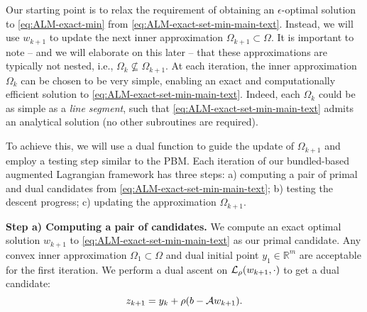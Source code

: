 \documentclass[11pt]{article}
\begin{document}
Our starting point is to relax the requirement of obtaining an $\epsilon$-optimal solution to \cref{eq:ALM-exact-min} from \cref{eq:ALM-exact-set-min-main-text}. Instead, we will use $w_{k+1}$ to update the next inner approximation $\Omega_{k+1} \subset \Omega$. 
It is important to note -- and we will elaborate on this later -- that these approximations are typically not nested, i.e.,  $\Omega_k \not\subseteq \Omega_{k+1}$. At each iteration, the inner approximation $\Omega_{k}$ can be chosen to be very simple, enabling an exact and computationally efficient solution to \cref{eq:ALM-exact-set-min-main-text}. Indeed, each $\Omega_{k}$ 
could be as simple as a \textit{line segment}, such that \cref{eq:ALM-exact-set-min-main-text} admits an analytical solution (no other subroutines are required). 

To achieve this, we will use a dual function to guide the update of $\Omega_{k+1}$ and employ a testing step similar to the PBM. Each iteration of our bundled-based augmented Lagrangian framework has three steps: a) computing a pair of primal and dual candidates from \cref{eq:ALM-exact-set-min-main-text}; b) testing the descent progress; c) updating the approximation $\Omega_{k+1}$. 

\vspace{3pt}

\noindent \textbf{Step a) Computing a pair of candidates.} 
We compute an exact optimal solution $w_{k+1}$ to \cref{eq:ALM-exact-set-min-main-text} as our primal candidate. Any convex inner approximation $\Omega_1 \subset \Omega$ and dual initial point $y_1 \in \mathbb{R}^m$ are acceptable for the first iteration. We perform a dual ascent on $\mathcal{L}_{\rho}(w_{k+1},\cdot)$ to get a dual candidate:  
\begin{equation} \label{eq:dual-update-ALM}
    z_{k+1} =  y_k + \rho ( b- \mathcal{A} w_{k+1}).
\end{equation}

\vspace{3pt}
\end{document}

